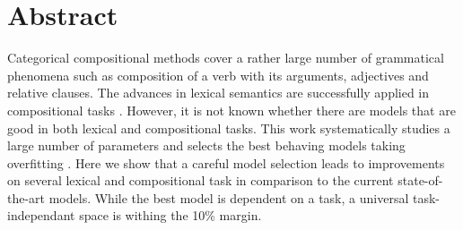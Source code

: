 \chapter*{Abstract}
\label{cha:abstract}

Categorical compositional methods \cite{DBLP:journals/corr/abs-1003-4394} cover a rather large number of grammatical phenomena such as composition of a verb with its arguments, adjectives and relative clauses. The advances in lexical semantics \cite{mikolov2013efficient,baroni-dinu-kruszewski:2014:P14-1,TACL570} are successfully applied in compositional tasks \cite{milajevs-EtAl:2014:EMNLP2014}. However, it is not known whether there are models that are good in both lexical and compositional tasks. This work systematically studies a large number of parameters and selects the best behaving models taking overfitting \cite{lapesa2014large}. Here we show that a careful model selection leads to improvements on several lexical and compositional task in comparison to the current state-of-the-art models. While the best model is dependent on a task, a universal task-independant space is withing the 10\% margin.

